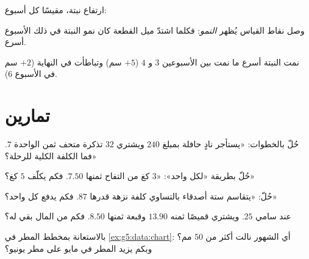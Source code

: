 \begin{example}\label{ex:g5:data:line}
ارتفاع نبتة، مقيسًا كل أسبوع:

\begin{omfigure}

{\small وصل نقاط القياس يُظهر \emph{النمو}: فكلما اشتدّ ميل
القطعة كان نمو النبتة في ذلك الأسبوع أسرع.}
\end{omfigure}

نمت النبتة أسرع ما نمت بين الأسبوعين $3$ و $4$ ($+5$ سم) وتباطأت
في النهاية ($+2$ سم في الأسبوع $6$).
\end{example}

\section{تمارين}

\begin{exercise}[$\star$]\label{exo:g5:data:1}
حُلّ بالخطوات: «يستأجر نادٍ حافلة بمبلغ $240$ ويشتري $32$ تذكرة
متحف ثمن الواحدة $7$. فما الكلفة الكلية للرحلة؟»
\end{exercise}

\begin{exercise}[$\star$]\label{exo:g5:data:2}
حُلّ بطريقة «لكل واحد»: «$3$ كغ من التفاح ثمنها $7.50$. فكم يكلّف
$5$ كغ؟»
\end{exercise}

\begin{exercise}[$\star$]\label{exo:g5:data:3}
حُلّ: «يتقاسم ستة أصدقاء بالتساوي كلفة نزهة قدرها $87$. فكم
يدفع كل واحد؟»
\end{exercise}

\begin{exercise}[$\star$]\label{exo:g5:data:4}
عند سامي $25$. ويشتري قميصًا ثمنه $13.90$ وقبعة ثمنها $8.50$. فكم
من المال بقي له؟
\end{exercise}

\begin{exercise}[$\star$]\label{exo:g5:data:5}
بالاستعانة بمخطط المطر في \cref{ex:g5:data:chart}: أي الشهور
نالت أكثر من $50$ مم؟ وبكم يزيد المطر في مايو على مطر
يونيو؟
\end{exercise}

